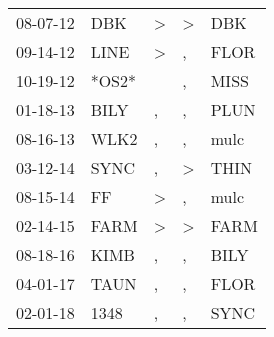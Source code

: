 \begin{supertabular}{lllll}
 08-07-12 &    DBK &  \textgreater &  \textgreater &   DBK \\
 09-14-12 &   LINE &  \textgreater &             , &  FLOR \\
 10-19-12 &  *OS2* &               &             , &  MISS \\
 01-18-13 &   BILY &             , &             , &  PLUN \\
 08-16-13 &   WLK2 &             , &             , &  mulc \\
 03-12-14 &   SYNC &             , &  \textgreater &  THIN \\
 08-15-14 &     FF &  \textgreater &             , &  mulc \\
 02-14-15 &   FARM &  \textgreater &  \textgreater &  FARM \\
 08-18-16 &   KIMB &             , &             , &  BILY \\
 04-01-17 &   TAUN &             , &             , &  FLOR \\
 02-01-18 &   1348 &             , &             , &  SYNC \\
\end{supertabular}
